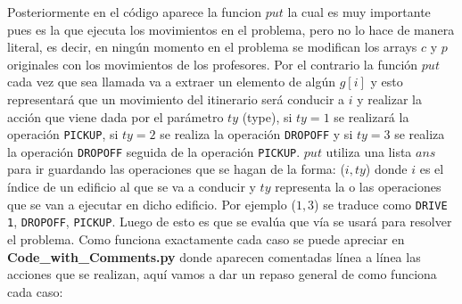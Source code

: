 \documentclass[11pt]{article}
\begin{document}
    Posteriormente en el código aparece la funcion $put$ la cual es muy importante pues es la que ejecuta los
    movimientos en el problema, pero no lo hace de manera literal, es decir, en ningún momento en el problema
    se modifican los arrays $c$ y $p$ originales con los movimientos de los profesores. Por el contrario la función
    $put$ cada vez que sea llamada va a extraer un elemento de algún $g[i]$ y esto representará que un movimiento
    del itinerario será conducir a $i$ y realizar la acción que viene dada por el parámetro $ty$ (type), si $ty = 1$
    se realizará la operación \texttt{PICKUP}, si $ty = 2$ se realiza la operación \texttt{DROPOFF} y si $ty = 3$ se
    realiza la operación \texttt{DROPOFF} seguida de la operación \texttt{PICKUP}. $put$ utiliza una lista $ans$
    para ir guardando las operaciones que se hagan de la forma: ($i, ty$) donde $i$ es el índice de un edificio al
    que se va a conducir y $ty$ representa la o las operaciones que se van a ejecutar en dicho edificio. Por ejemplo
    ($1,3$) se traduce como \texttt{DRIVE 1}, \texttt{DROPOFF}, \texttt{PICKUP}. Luego de esto es que se evalúa que 
    vía se usará para resolver el problema. Como funciona exactamente cada caso se puede apreciar en 
    \textbf{Code\_with\_Comments.py} donde aparecen comentadas línea a línea las acciones que se realizan, aquí vamos 
    a dar un repaso general de como funciona cada caso:
\end{document}
